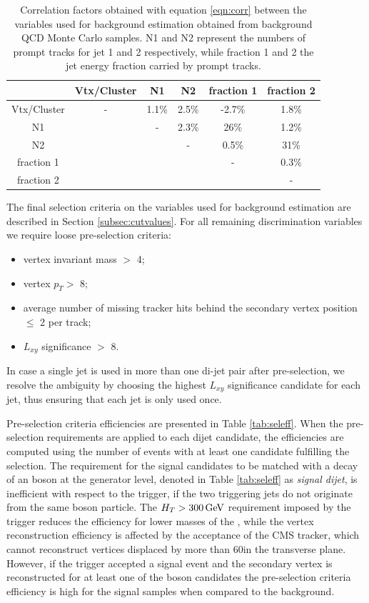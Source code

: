 \begin{table}[htbp]
\centering
\caption{Correlation factors obtained with equation \ref{eqn:corr} between the variables 
used for background estimation obtained from background QCD Monte
Carlo samples. N1 and N2 represent the numbers
of prompt tracks for jet 1 and 2 respectively, while fraction 1 and 2 the jet energy fraction carried by 
prompt tracks.
\label{tab:corr}}
\begin{tabular}{c|ccccc}
 & Vtx/Cluster & N1 & N2 & fraction 1 & fraction 2 \\
\hline
Vtx/Cluster & - & 1.1\% & 2.5\% & -2.7\% & 1.8\%  \\
N1 & & - & 2.3\% & 26\%  & 1.2\% \\
N2 & & & - & 0.5\% & 31\% \\
fraction 1 & & & & - & 0.3\% \\
fraction 2 & & & & & - \\
\end{tabular}
\end{table}

The final selection criteria on the variables used for background estimation are described in Section 
\ref{subsec:cutvalues}. For all remaining discrimination variables we require loose pre-selection criteria:   
\begin{itemize}
 \item vertex invariant mass $>$ 4\GeVcc;
 \item vertex $p_T>$ 8\GeVc;
 \item average number of missing tracker hits behind the secondary vertex position $\leq$ 2 per track;
 \item $L_{xy}$ significance $>$ 8.
\end{itemize}

In case a single jet is used in more than one di-jet pair after pre-selection, we resolve
the ambiguity by choosing the highest $L_{xy}$ significance candidate for each jet, thus ensuring that
each jet is only used once. 

Pre-selection criteria efficiencies are presented in Table \ref{tab:seleff}.  
When the pre-selection requirements are applied to each dijet candidate,
the efficiencies are computed using the number of events with at least one candidate fulfilling the selection.
The requirement for the signal candidates to be matched with a decay of an \X boson at the generator level,
 denoted in Table \ref{tab:seleff} as {\it signal dijet}, 
is inefficient with respect to the trigger, if the two triggering
jets do not originate from the same \X boson particle.  
The $H_T>300\,\text{Ge\hspace{-.08em}V}$ requirement imposed by the trigger reduces the efficiency for lower masses of the \Higgs, 
while the vertex reconstruction efficiency is affected by the acceptance of the CMS tracker, which cannot 
reconstruct vertices displaced by more than 60\cm in the transverse plane. However, if the trigger accepted a signal event and the secondary vertex is reconstructed
for at least one of the \X boson candidates the pre-selection criteria efficiency is high for the signal samples
when compared to the background.   

